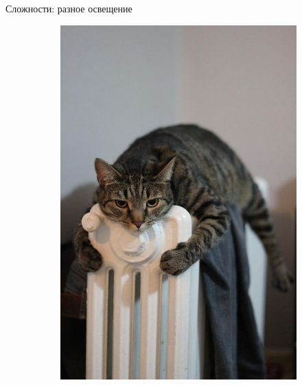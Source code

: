 \documentclass[aspectratio=169]{beamer}
\begin{document}
\begin{frame}{Сложности: разное освещение}
\begin{figure}
\begin{subfigure}[b]{.3\linewidth}
            \includegraphics[width=\linewidth]{graphs/fig9_1.jpg}
        \end{subfigure}
        \begin{subfigure}[b]{.3\linewidth}

\end{subfigure}
\end{figure}
\end{frame}
\end{document}
